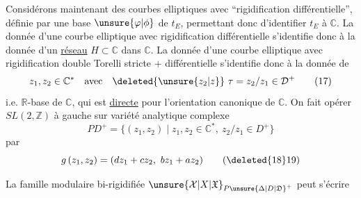 Considérons maintenant des courbes elliptiques  avec ``rigidification différentielle'', définie par une base $\unsure{\varphi|\phi}$ de $t_E$, permettant donc d'identifier $t_E$ à $\mathbb C$. La donnée d'une courbe elliptique avec rigidification différentielle s'identifie donc à la donnée d'un \uline{réseau} $H\subset\mathbb C$ dans $\mathbb C$. La donnée d'une courbe elliptique avec rigidification double Torelli stricte $+$ différentielle s'identifie donc à la donnée de
\[
z_1,z_2\in\mathbb C^*\quad\text{avec}\quad
\deleted{\unsure{z_2|z}}\ \tau=z_2/z_1\in\mathcal D^+\tag*{(17)}
\]
i.e.  $\mathbb R$-base de $\mathbb C$, qui est \uline{directe} pour l'orientation canonique de $\mathbb C$. On fait opérer $SL(2,\mathbb Z)$ à gauche sur  variété analytique complexe
\[
PD^+=\{(z_1,z_2)\mid z_1,z_2\in\mathbb C^*,\ z_2/z_1\in D^+\}\tag*{(18)}
\]
par
\[
g\,(z_1,z_2)=(dz_1+cz_2,\ bz_1+az_2)\tag*{(\deleted{18}19)}
\]

La famille modulaire bi-rigidifiée $\unsure{\mathcal X|X|\mathfrak X}_{P\unsure{\Delta|D|\mathfrak D}^+}$ peut s'écrire
